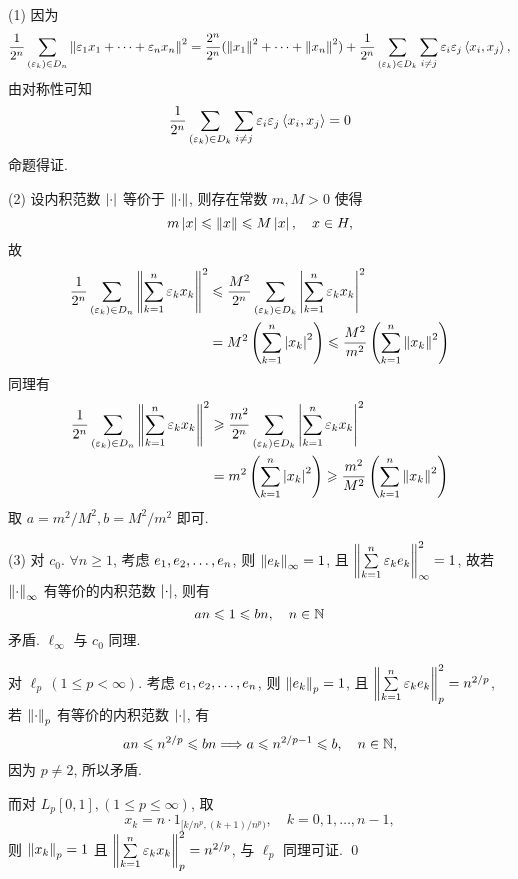    \begin{Proof}
        (1) 因为
        \[
            \frac{1}{2^{n}}\sum_{(\varepsilon_{k})\in D_{n}}\left\| \varepsilon_{1}x_{1}+\cdots+\varepsilon_{n}x_{n} \right\|^{2}=\frac{2^{n}}{2^{n}}(\left\| x_{1} \right\|^{2}+\cdots+\left\| x_{n} \right\|^{2})+\frac{1}{2^{n}}\sum_{(\varepsilon_{k})\in D_{k}}\sum_{i\ne j}\varepsilon_{i}\varepsilon_{j}\left\langle x_{i}, x_{j} \right\rangle,
        \]
        由对称性可知
        \[
            \frac{1}{2^{n}}\sum_{(\varepsilon_{k})\in D_{k}}\sum_{i\ne j}\varepsilon_{i}\varepsilon_{j}\left\langle x_{i}, x_{j} \right\rangle=0
        \]
        命题得证.

        (2) 设内积范数 $ \left| \cdot \right|  $ 等价于 $ \left\| \cdot \right\| $, 则存在常数 $ m, M>0 $ 使得
        \[
            m\left| x \right| \leqslant\left\| x \right\|\leqslant M\left| x \right| , \quad x\in H,
        \]
        故
        \[
            \begin{aligned}
                \frac{1}{2^{n}}\sum_{(\varepsilon_{k})\in D_{n}}\left\| \sum_{k=1}^{n}\varepsilon_{k}x_{k} \right\|^{2} & \leqslant \frac{M^{2}}{2^{n}}\sum_{(\varepsilon_{k})\in D_{k}}\left| \sum_{k=1}^{n}\varepsilon_{k}x_{k} \right| ^{2}  \\
                & = M^{2}\left(\sum_{k=1}^{n}\left| x_{k} \right| ^{2}\right)\leqslant \frac{M^{2}}{m^{2}}\left(\sum_{k=1}^{n}\left\| x_{k} \right\|^{2}\right)
            \end{aligned}
        \]
        同理有
        \[
            \begin{aligned}
                \frac{1}{2^{n}}\sum_{\left(\varepsilon_{k}\right)\in D_{n}}\left\| \sum_{k=1}^{n}\varepsilon_{k}x_{k} \right\|^{2} & \geqslant \frac{m^{2}}{2^{n}}\sum_{\left(\varepsilon_{k}\right)\in D_{k}}\left| \sum_{k=1}^{n}\varepsilon_{k}x_{k} \right| ^{2}  \\
                 & = m^{2}\left(\sum_{k=1}^{n}\left| x_{k} \right| ^{2}\right)\geqslant \frac{m^{2}}{M^{2}}\left(\sum_{k=1}^{n}\left\| x_{k} \right\|^{2}\right)
            \end{aligned}
        \]
        取 $ a=m^{2}/M^{2}, b=M^{2}/m^{2} $ 即可.

        (3) 对 $ c_{0} $. $ \forall n\geqslant1 $, 考虑 $ e_{1}, e_{2}, \dots, e_{n} $, 则 $ \left\| e_{k} \right\|_{\infty}=1 $, 且 $ \left\| \sum\limits_{k=1}^{n}\varepsilon_{k}e_{k} \right\|_{\infty}^{2}=1 $, 故若 $ \left\| \cdot \right\|_{\infty} $ 有等价的内积范数 $ \left| \cdot \right|  $, 则有
        \[
            an\leqslant1\leqslant bn, \quad n\in\mathbb{N}
        \]
        矛盾. $ \ell_{\infty} $ 与 $ c_{0} $ 同理.

        对 $ \ell_{p}\,(1\leqslant p<\infty) $. 考虑 $ e_{1}, e_{2}, \dots, e_{n} $, 则 $ \left\| e_{k} \right\|_{p}=1 $, 且 $ \left\| \sum\limits_{k=1}^{n}\varepsilon_{k}e_{k} \right\|^{2}_{p}=n^{2/p} $, 若 $ \left\| \cdot \right\|_{p} $ 有等价的内积范数 $ \left| \cdot \right|  $, 有
        \[
            an\leqslant n^{2/p} \leqslant bn\Longrightarrow a\leqslant n^{2/p-1}\leqslant b, \quad n\in\mathbb{N},
        \]
        因为 $ p\ne 2 $, 所以矛盾.

        而对 $ L_{p}[0, 1], (1\leqslant p\leqslant\infty) $, 取
        \[
            x_{k}=n\cdot1_{[{k}/{n^p}, ({k+1})/{n^p})}, \quad k = 0, 1, \dots, n-1,
        \]
        则 $ \left\| x_{k} \right\|_{p}=1 $ 且 $ \left\| \sum\limits_{k=1}^{n}\varepsilon_{k}x_{k} \right\|_{p}^{2}=n^{2/p} $, 与 $ \ell_{p} $ 同理可证. \qed
    \end{Proof}

